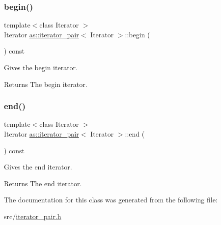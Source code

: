 \subsubsection{\texorpdfstring{begin()}{begin()}}
{\footnotesize\ttfamily template$<$class Iterator $>$ \\
Iterator \hyperlink{classas_1_1iterator__pair}{as\+::iterator\+\_\+pair}$<$ Iterator $>$\+::begin (\begin{DoxyParamCaption}{ }\end{DoxyParamCaption}) const\hspace{0.3cm}{\ttfamily [inline]}}



Gives the begin iterator. 

\begin{DoxyReturn}{Returns}
The begin iterator. 
\end{DoxyReturn}
\mbox{\label{classas_1_1iterator__pair_ae7cef6e91faecd20e6aebd2f21b29b41}} 
\subsubsection{\texorpdfstring{end()}{end()}}
{\footnotesize\ttfamily template$<$class Iterator $>$ \\
Iterator \hyperlink{classas_1_1iterator__pair}{as\+::iterator\+\_\+pair}$<$ Iterator $>$\+::end (\begin{DoxyParamCaption}{ }\end{DoxyParamCaption}) const\hspace{0.3cm}{\ttfamily [inline]}}



Gives the end iterator. 

\begin{DoxyReturn}{Returns}
The end iterator. 
\end{DoxyReturn}


The documentation for this class was generated from the following file\+:\begin{DoxyCompactItemize}
\item 
src/\hyperlink{iterator__pair_8h}{iterator\+\_\+pair.\+h}\end{DoxyCompactItemize}
